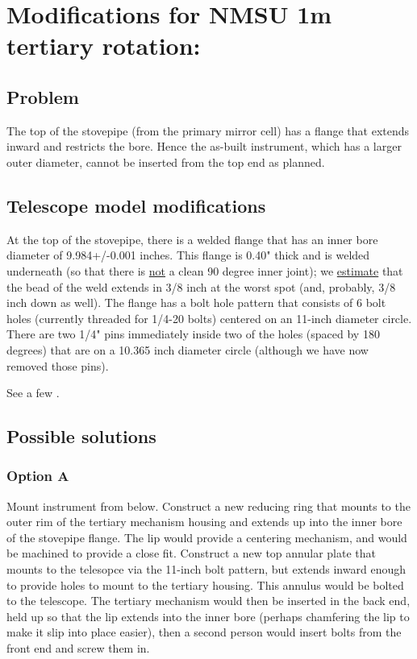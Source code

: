 \documentclass{article}
\begin{document}
\section{Modifications for NMSU 1m tertiary rotation:}

\subsection{Problem}

The top of the stovepipe (from the primary mirror cell) has a flange
that extends inward and restricts the bore. Hence the as-built instrument, 
which has a larger outer diameter, cannot be inserted from the top end as
planned.

\subsection{Telescope model modifications}

 At the top of the stovepipe, there
is a welded flange that has an inner bore diameter of 9.984+/-0.001
inches. This flange is 0.40" thick and is welded underneath (so
that there is \underline{not} a clean 90 degree inner joint); we \underline{estimate} that
the bead of the weld extends in 3/8 inch at the worst spot (and, probably,
3/8 inch down as well).  The flange has a bolt hole pattern that
consists of 6 bolt holes (currently threaded for 1/4-20 bolts) centered
on an 11-inch diameter circle. There are two 1/4" pins immediately
inside two of the holes (spaced by 180 degrees) that are on a 10.365 inch
diameter circle (although we have now removed those pins).

See a few .

\subsection{Possible solutions}

\subsubsection{Option A}
  Mount instrument from below. Construct a new reducing ring
that mounts to the outer rim of the tertiary mechanism housing and
extends up into the inner bore of the stovepipe flange. The lip would
provide a centering mechanism, and would be machined to provide a close
fit. Construct a new top annular plate that mounts to the telesopce via the
11-inch bolt pattern, but extends inward enough to provide holes to
mount to the tertiary housing. This annulus would be bolted to the telescope.
The tertiary mechanism would then be inserted in the back end, held
up so that the lip extends into the inner bore (perhaps chamfering
the lip to make it slip into place easier), then a second person
would insert bolts from the front end and screw them in.
\end{document}

